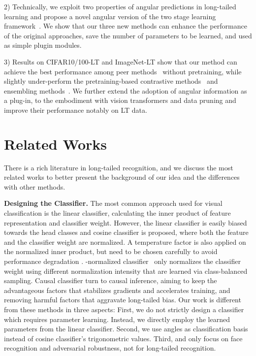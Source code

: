 \documentclass[10pt,twocolumn,letterpaper]{article}
\begin{document}
2) Technically, we exploit two properties of angular predictions in long-tailed learning and propose a novel angular version of the two stage learning framework~\cite{mislas}. We show that our three new methods can enhance the performance of the original approaches, save the number of parameters to be learned, and used as simple plugin modules.

3) Results on CIFAR10/100-LT and ImageNet-LT show that our method can achieve the best performance among peer methods~\cite{mislas} without pretraining, while slightly under-perform the pretraining-based contrastive methods~\cite{bcl} and ensembling methods~\cite{ncl}. We further extend the adoption of angular information as a plug-in, to the embodiment with vision transformers and data pruning and improve their performance notably on LT data.
\section{Related Works}
There is a rich literature in long-tailed recognition, and we  discuss the most related works to better present the background of our idea and the differences with other methods.

\textbf{Designing the Classifier.}
The most common approach used for visual classification is the linear classifier, calculating the inner product of feature representation and classifier weight. However, the linear classifier is easily biased towards the head classes and cosine classifier \cite{embedaugment,ad_robust} is proposed, where both the feature and the classifier weight are normalized. A temperature factor is also applied on the normalized inner product, but need to be chosen carefully to avoid performance degradation \cite{identifyingAC}. -normalized classifier~\cite{decoupling} only normalizes the classifier weight using different normalization intensity that are learned via class-balanced sampling. Causal classifier \cite{tde} turn to causal inference, aiming to keep the advantageous factors that stabilizes gradients and accelerates training, and removing harmful factors that aggravate long-tailed bias. Our work is different from these methods in three aspects: First, we do not strictly design a classifier which requires parameter learning. Instead, we directly employ the learned parameters from the linear classifier. Second, we use angles as classification basis instead of cosine classifier's trigonometric values. Third, \cite{embedaugment} and \cite{ad_robust} only focus on face recognition and adversarial robustness, not for long-tailed recognition.
\end{document}
